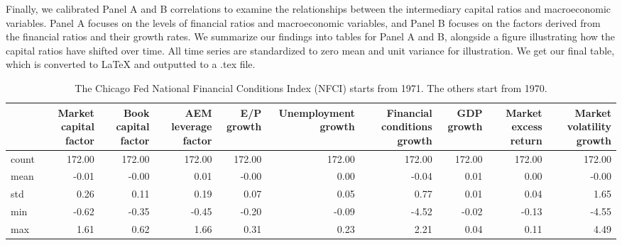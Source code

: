 \documentclass{article}
\begin{document}
Finally, we calibrated Panel A and B correlations to examine the relationships between the intermediary capital ratios and macroeconomic variables. Panel A focuses on the levels of financial ratios and macroeconomic variables, and Panel B focuses on the factors derived from the financial ratios and their growth rates. We summarize our findings into tables for Panel A and B, alongside a figure illustrating how the capital ratios have shifted over time. All time series are standardized to zero mean and unit variance for illustration. We get our final table, which is converted to LaTeX and outputted to a .tex file.
\begin{table}
\caption{The Chicago Fed National Financial Conditions Index (NFCI) starts from 1971. The others start from 1970.}
\label{tab:Table 2.1}
\begin{tabular}{lrrrrrrrrr}
\toprule
 & Market capital factor & Book capital factor & AEM leverage factor & E/P growth & Unemployment growth & Financial conditions growth & GDP growth & Market excess return & Market volatility growth \\
\midrule
count & 172.00 & 172.00 & 172.00 & 172.00 & 172.00 & 172.00 & 172.00 & 172.00 & 172.00 \\
mean & -0.01 & -0.00 & 0.01 & -0.00 & 0.00 & -0.04 & 0.01 & 0.00 & -0.00 \\
std & 0.26 & 0.11 & 0.19 & 0.07 & 0.05 & 0.77 & 0.01 & 0.04 & 1.65 \\
min & -0.62 & -0.35 & -0.45 & -0.20 & -0.09 & -4.52 & -0.02 & -0.13 & -4.55 \\
max & 1.61 & 0.62 & 1.66 & 0.31 & 0.23 & 2.21 & 0.04 & 0.11 & 4.49 \\
\bottomrule
\end{tabular}
\end{table}
\end{document}
